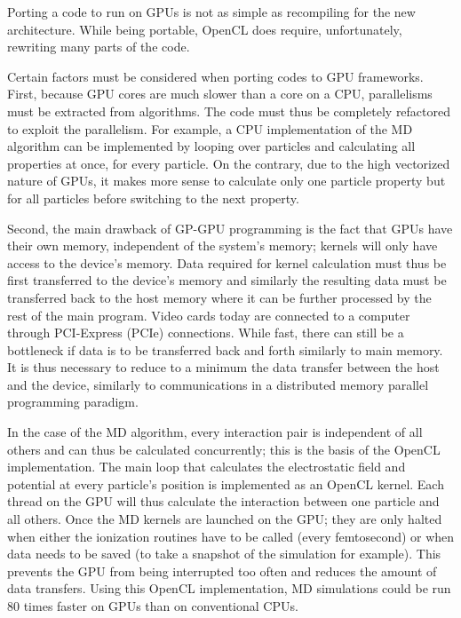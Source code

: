 Porting a code to run on GPUs is not as simple as recompiling
for the new architecture. While being portable, OpenCL does require, unfortunately, rewriting
many parts of the code.



Certain factors must be considered when porting codes to GPU frameworks.
First, because GPU cores are much slower than a core on a CPU,
parallelisms must be extracted from algorithms. The code must thus be
completely refactored to exploit the parallelism. For example, a CPU
implementation of the MD algorithm can be implemented by looping over particles
and calculating all properties at once, for every particle. On the contrary,
due to the high vectorized nature of GPUs, it makes more sense to calculate
only one particle property but for all particles before switching to the next
property.

Second, the main drawback of
GP-GPU programming is the fact that GPUs have their own memory, independent of
the system's memory; kernels will only have access to the device's memory. Data
required for kernel calculation must thus be first transferred to the device's
memory and similarly the resulting data must be transferred back to the host
memory where it can be further processed by the rest of the main program. Video
cards today are connected to a computer through PCI-Express (PCIe) connections.
While fast, there can still be a bottleneck if data is to be transferred back and
forth similarly to main memory. It is thus necessary to reduce to a minimum the
data transfer between the host and the device, similarly to communications in a
distributed memory parallel programming paradigm.

In the case of the MD algorithm, every interaction pair is independent of all
others and can thus be calculated concurrently; this is the basis of the
OpenCL implementation. The main loop that calculates the electrostatic field
and potential at every particle's position is implemented as an OpenCL kernel.
Each thread on the GPU will thus calculate the interaction between one particle
and all others. Once the MD kernels are launched on the GPU; they are only
halted when either the ionization routines have to be called (every femtosecond) or
when data needs to be saved (to take a snapshot of the simulation for example).
This prevents the GPU from being interrupted too often and reduces the amount of
data transfers. Using this OpenCL implementation, MD simulations could be run
80 times faster on GPUs than on conventional CPUs.

